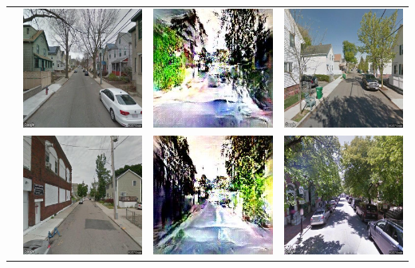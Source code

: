 \begin{table}
\begin{tabular}{l*3{C}@{}}
		& \includegraphics[width=11em]{Plot/examples/u_7} & \includegraphics[width=11em]{Plot/examples/t_7} &  \includegraphics[width=11em]{Plot/examples/b_7} \\ 
		& \includegraphics[width=11em]{Plot/examples/u_8} & \includegraphics[width=11em]{Plot/examples/t_8} &  \includegraphics[width=11em]{Plot/examples/b_8} \\ 

\end{tabular}
\end{table}

